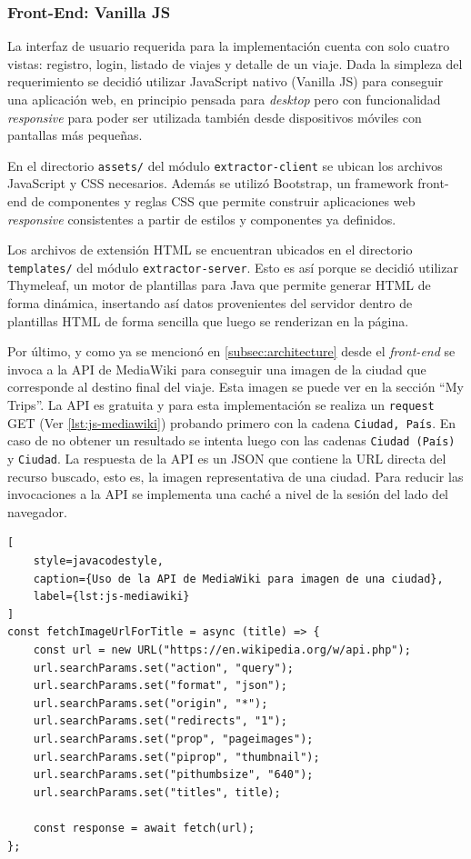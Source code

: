 \subsubsection{Front-End: Vanilla JS}

La interfaz de usuario requerida para la implementación cuenta con solo cuatro vistas: registro, login, listado de
viajes y detalle de un viaje.
Dada la simpleza del requerimiento se decidió utilizar JavaScript nativo (Vanilla JS) para conseguir una aplicación
web, en principio pensada para \textit{desktop} pero con funcionalidad \textit{responsive} para poder ser utilizada
también desde dispositivos móviles con pantallas más pequeñas.

En el directorio \texttt{assets/} del módulo \texttt{extractor-client} se ubican los archivos JavaScript y CSS
necesarios.
Además se utilizó Bootstrap, un framework front-end de componentes y reglas CSS que permite construir aplicaciones web
\textit{responsive} consistentes a partir de estilos y componentes ya definidos.

Los archivos de extensión HTML se encuentran ubicados en el directorio \texttt{templates/} del módulo
\texttt{extractor-server}.
Esto es así porque se decidió utilizar Thymeleaf, un motor de plantillas para Java que permite generar HTML de forma
dinámica, insertando así datos provenientes del servidor dentro de plantillas HTML de forma sencilla que luego se
renderizan en la página.

Por último, y como ya se mencionó en \autoref{subsec:architecture} desde el \textit{front-end} se invoca a la API
de MediaWiki para conseguir una imagen de la ciudad que corresponde al destino final del viaje.
Esta imagen se puede ver en la sección ``My Trips''.
La API es gratuita y para esta implementación se realiza un \texttt{request} GET (Ver \autoref{lst:js-mediawiki})
probando primero con la cadena \texttt{Ciudad, País}.
En caso de no obtener un resultado se intenta luego con las cadenas \texttt{Ciudad (País)} y \texttt{Ciudad}.
La respuesta de la API es un JSON que contiene la URL directa del recurso buscado, esto es, la imagen representativa
de una ciudad.
Para reducir las invocaciones a la API se implementa una caché a nivel de la sesión del lado del navegador.
\pagebreak
\begin{lstlisting}[
    style=javacodestyle,
    caption={Uso de la API de MediaWiki para imagen de una ciudad},
    label={lst:js-mediawiki}
]
const fetchImageUrlForTitle = async (title) => {
    const url = new URL("https://en.wikipedia.org/w/api.php");
    url.searchParams.set("action", "query");
    url.searchParams.set("format", "json");
    url.searchParams.set("origin", "*");
    url.searchParams.set("redirects", "1");
    url.searchParams.set("prop", "pageimages");
    url.searchParams.set("piprop", "thumbnail");
    url.searchParams.set("pithumbsize", "640");
    url.searchParams.set("titles", title);

    const response = await fetch(url);
};
\end{lstlisting}

